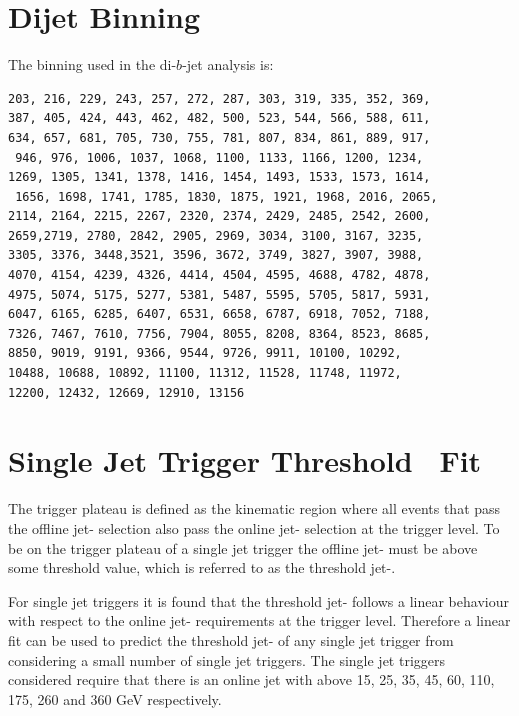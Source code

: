 
\appendix
\chapter{Dijet Binning}
\label{app:dijet_bins}

\noindent
The binning used in the di-$b$-jet analysis is:
\begin{verbatim}
203, 216, 229, 243, 257, 272, 287, 303, 319, 335, 352, 369,
387, 405, 424, 443, 462, 482, 500, 523, 544, 566, 588, 611, 
634, 657, 681, 705, 730, 755, 781, 807, 834, 861, 889, 917,
 946, 976, 1006, 1037, 1068, 1100, 1133, 1166, 1200, 1234, 
1269, 1305, 1341, 1378, 1416, 1454, 1493, 1533, 1573, 1614,
 1656, 1698, 1741, 1785, 1830, 1875, 1921, 1968, 2016, 2065, 
2114, 2164, 2215, 2267, 2320, 2374, 2429, 2485, 2542, 2600, 
2659,2719, 2780, 2842, 2905, 2969, 3034, 3100, 3167, 3235, 
3305, 3376, 3448,3521, 3596, 3672, 3749, 3827, 3907, 3988, 
4070, 4154, 4239, 4326, 4414, 4504, 4595, 4688, 4782, 4878, 
4975, 5074, 5175, 5277, 5381, 5487, 5595, 5705, 5817, 5931, 
6047, 6165, 6285, 6407, 6531, 6658, 6787, 6918, 7052, 7188, 
7326, 7467, 7610, 7756, 7904, 8055, 8208, 8364, 8523, 8685, 
8850, 9019, 9191, 9366, 9544, 9726, 9911, 10100, 10292, 
10488, 10688, 10892, 11100, 11312, 11528, 11748, 11972, 
12200, 12432, 12669, 12910, 13156
\end{verbatim}

\chapter{Single Jet Trigger Threshold~\pT{} Fit}
\label{app:triggerTurnOn_fit}

The trigger plateau is defined as the kinematic region where all events that pass the offline jet-\pT{} selection
also pass the online jet-\pT{} selection at the trigger level.
To be on the trigger plateau of a single jet trigger
the offline jet-\pT{} must be above some threshold value,
which is referred to as the threshold jet-\pT{}.

For single jet triggers it is found that the threshold jet-\pT{} follows
a linear behaviour with respect to the online jet-\pT{} requirements at the trigger level.
Therefore a linear fit can be used to predict the threshold jet-\pT{} of any single jet trigger
from considering a small number of single jet triggers.
The single jet triggers considered require that there is an online jet with \pT{} above
15, 25, 35, 45, 60, 110, 175, 260 and 360 GeV respectively.

